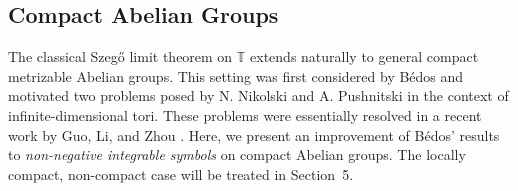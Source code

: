 \documentclass{amsart}
\theoremstyle{definition}
\theoremstyle{remark}
\numberwithin{equation}{section}
\newcommand{\ip}[2]{\left\langle {#1} , {#2} \right\rangle} %
\newcommand{\norm}[1]{\left\lVert #1 \right\rVert} %
\newcommand{\C}{\mathbb{C}} %
\begin{document}

\subsection{Compact Abelian Groups}

The classical Szeg\H{o} limit theorem on $\mathbb{T}$ extends naturally to general compact metrizable Abelian groups. This setting was first considered by B\'edos \cite{bedos1996folner} and motivated two problems posed by N. Nikolski and A. Pushnitski \cite{nikolski2020szeg} in the context of infinite-dimensional tori. These problems were essentially resolved in a recent work by Guo, Li, and Zhou \cite{guo2024first}. Here, we present an improvement of B\'edos' results to \emph{non-negative integrable symbols} on compact Abelian groups. The locally compact, non-compact case will be treated in Section~5.
\end{document}
